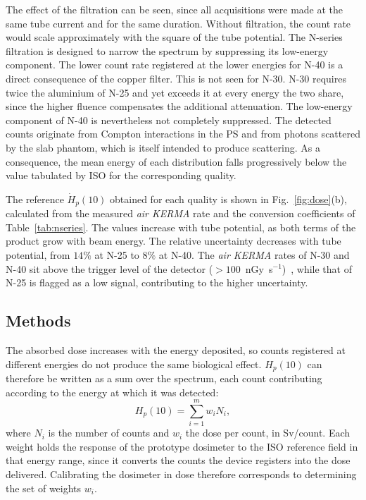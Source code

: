 The effect of the filtration can be seen, since all acquisitions were made at the same tube current and for the same duration. Without filtration, the count rate would scale approximately with the square of the tube potential. The N-series filtration is designed to narrow the spectrum by suppressing its low-energy component. The lower count rate registered at the lower energies for N-40 is a direct consequence of the copper filter. This is not seen for N-30. N-30 requires twice the aluminium of N-25 and yet exceeds it at every energy the two share, since the higher fluence compensates the additional attenuation. The low-energy component of N-40 is nevertheless not completely suppressed. The detected counts originate from Compton interactions in the PS and from photons scattered by the slab phantom, which is itself intended to produce scattering. As a consequence, the mean energy of each distribution falls progressively below the value tabulated by ISO for the corresponding quality.

The reference $\dot{H}_p(10)$ obtained for each quality is shown in Fig.~\ref{fig:dose}(b), calculated from the measured \emph{air KERMA} rate and the conversion coefficients of Table~\ref{tab:nseries}. The values increase with tube potential, as both terms of the product grow with beam energy. The relative uncertainty decreases with tube potential, from $14\%$ at N-25 to $8\%$ at N-40. The \emph{air KERMA} rates of N-30 and N-40 sit above the trigger level of the detector ($>100$~nGy~s$^{-1}$)~\cite{Specs}, while that of N-25 is flagged as a low signal, contributing to the higher uncertainty.

\subsection{Methods}

The absorbed dose increases with the energy deposited, so counts registered at different energies do not produce the same biological effect. $H_p(10)$ can therefore be written as a sum over the spectrum, each count contributing according to the energy at which it was detected:
\begin{equation}
H_p(10) = \sum_{i=1}^{m} w_i N_i ,
\label{eq:bin_model}
\end{equation}
where $N_i$ is the number of counts and $w_i$ the dose per count, in Sv/count.  Each weight holds the response of the prototype dosimeter to the ISO reference field in that energy range, since it converts the counts the device registers into the dose delivered. Calibrating the dosimeter in dose therefore corresponds to determining the set of weights $w_i$.
 
